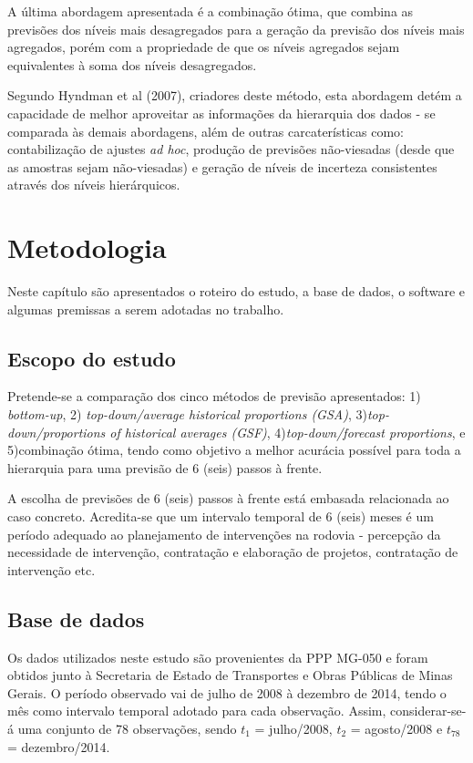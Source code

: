 \documentclass[
	12pt,				%
	openright,			%
	twoside,			%
	a4paper,			%
	english,			%
	french,				%
	spanish,			%
	brazil				%
	]{abntex2}
\begin{document}
A última abordagem apresentada é a combinação ótima, que combina as previsões dos níveis mais desagregados para a geração da previsão dos níveis mais agregados, porém com a propriedade de que os níveis agregados sejam equivalentes à soma dos níveis desagregados.

Segundo Hyndman et al (2007), criadores deste método, esta abordagem detém a capacidade de melhor aproveitar as informações da hierarquia dos dados - se comparada às demais abordagens, além de outras carcaterísticas como: contabilização de ajustes \emph{ad hoc}, produção de previsões não-viesadas (desde que as amostras sejam não-viesadas) e geração de níveis de incerteza consistentes através dos níveis hierárquicos. 


\chapter{Metodologia}
\label{chap:metodologia}

Neste capítulo são apresentados o roteiro do estudo, a base de dados, o software e algumas premissas a serem adotadas no trabalho.

\section{Escopo do estudo}

Pretende-se a comparação dos cinco métodos de previsão apresentados:  1) \emph{bottom-up}, 2) \emph{top-down/average historical proportions (GSA)}, 3)\emph{top-down/proportions of historical averages (GSF)}, 4)\emph{top-down/forecast proportions}, e 5)combinação ótima, tendo como objetivo a melhor acurácia possível para toda a hierarquia para uma previsão de 6 (seis) passos à frente.

A escolha de previsões de 6 (seis) passos à frente está embasada relacionada ao caso concreto. Acredita-se que um intervalo temporal de 6 (seis) meses é um período adequado ao planejamento de intervenções na rodovia - percepção da necessidade de intervenção, contratação e elaboração de projetos, contratação de intervenção etc.

\section{Base de dados}

Os dados utilizados neste estudo são provenientes da PPP MG-050 e foram obtidos junto à Secretaria de Estado de Transportes e Obras Públicas de Minas Gerais.
O período observado vai de julho de 2008 à dezembro de 2014, tendo o mês como intervalo temporal adotado para cada observação. Assim, considerar-se-á uma conjunto de 78 observações, sendo $t_1$ = julho/2008, $t_2$ = agosto/2008 e $t_{78}$ = dezembro/2014.
\end{document}
